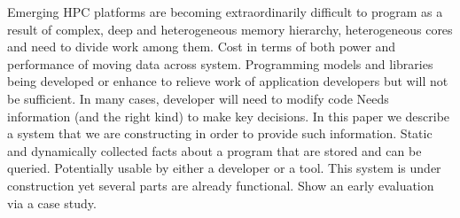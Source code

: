 Emerging HPC platforms are becoming extraordinarily difficult to program as a result of complex, deep  and heterogeneous memory hierarchy, heterogeneous cores and need to divide work among them. Cost in terms of both power and performance of moving data across system.
Programming models and libraries being developed or enhance to relieve work of application developers but will not be sufficient. In many cases, developer will need to modify code
Needs information (and the right kind) to make key decisions.
In this paper we describe a system that we are constructing in order to provide such information. Static and dynamically collected facts about a program that are stored and can be queried. Potentially usable by either a developer or a tool. This system is under construction yet several parts are already functional. 
Show an early evaluation via a case study.
